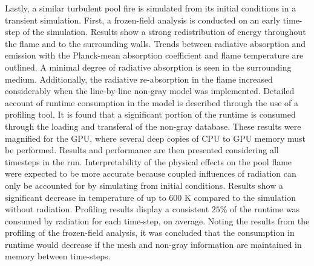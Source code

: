 Lastly, a similar turbulent pool fire is simulated from its initial conditions in a transient simulation. First, a frozen-field analysis is conducted on an early time-step of the simulation. Results show a strong redistribution of energy throughout the flame and to the surrounding walls. Trends between radiative absorption and emission with the Planck-mean absorption coefficient and flame temperature are outlined. A minimal degree of radiative absorption is seen in the surrounding medium. Additionally, the radiative re-absorption in the flame increased considerably when the line-by-line non-gray model was implemented. Detailed account of runtime consumption in the model is described through the use of a profiling tool. It is found that a significant portion of the runtime is consumed through the loading and transferal of the non-gray database. These results were magnified for the GPU, where several deep copies of CPU to GPU memory must be performed.
Results and performance are then presented considering all timesteps in the run. Interpretability of the physical effects on the pool flame were expected to be more accurate because coupled influences of radiation can only be accounted for by simulating from initial conditions. Results show a significant decrease in temperature of up to $600$ K compared to the simulation without radiation. Profiling results display a consistent $25$\% of the runtime was consumed by radiation for each time-step, on average. Noting the results from the profiling of the frozen-field analysis, it was concluded that the consumption in runtime would decrease if the mesh and non-gray information are maintained in memory between time-steps.


